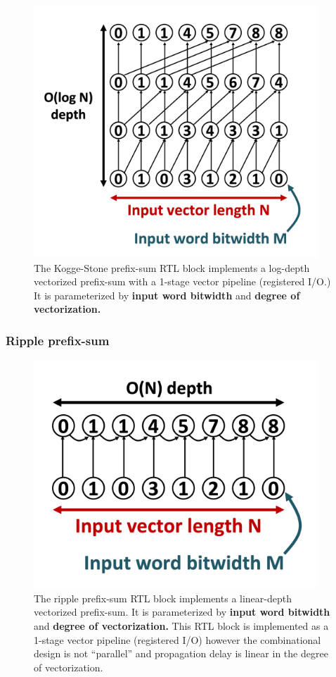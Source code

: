 \begin{figure}[H]
    \centering
    \includegraphics[width=0.95\textwidth]{figures/kogge_stone_prefix_sum.png}
    \caption{The Kogge-Stone\cite{koggestone} prefix-sum RTL block implements a log-depth vectorized prefix-sum with a 1-stage vector pipeline (registered I/O.) It is parameterized by \textbf{input word bitwidth} and \textbf{degree of vectorization.}}
    \label{fig:hierarchical_general_format_sparse_smartbuffer}
\end{figure}

\subsubsection{Ripple prefix-sum}


\begin{figure}[H]
    \centering
    \includegraphics[width=0.95\textwidth]{figures/ripple_prefix_sum.png}
    \caption{The ripple prefix-sum RTL block implements a linear-depth vectorized prefix-sum. It is parameterized by \textbf{input word bitwidth} and \textbf{degree of vectorization.} This RTL block is implemented as a 1-stage vector pipeline (registered I/O) however the combinational design is not ``parallel'' and propagation delay is linear in the degree of vectorization.}
    \label{fig:ripple_prefix_sum}
\end{figure}
